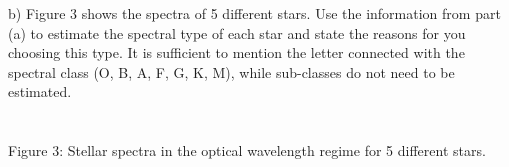 \noindent
b) Figure 3 shows the spectra of 5 different stars. Use the information from part (a) to estimate the
spectral type of each star and state the reasons for you choosing this type. It is sufficient to mention
the letter connected with the spectral class (O, B, A, F, G, K, M), while sub-classes do not need to be
estimated.\\
\\

\noindent{}\\
\noindent
Figure 3: Stellar spectra in the optical wavelength regime for 5 different stars.\\
\\
